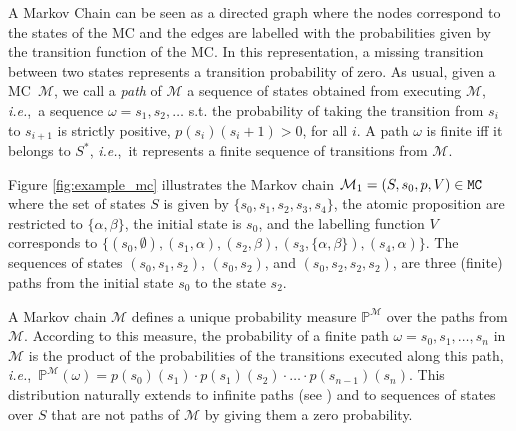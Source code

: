 \documentclass{llncs}
\newcommand{\mc}{\textnormal{MC}}
\newcommand{\mcSet} {\ensuremath{\tt{MC}}}
\newcommand{\ie} {{\em i.e.},\ }
\newcommand{\custompar}[1]{\smallskip \noindent {\bf #1}}
\begin{document}
A Markov Chain can be seen as a directed graph
where the nodes correspond to the states of the {\mc} and
the edges are labelled with the probabilities given by the transition function of the {\mc}.
In this representation, a missing transition between two states 
represents a transition probability of zero.
As usual, given a {\mc}~$\mathcal{M}$, we call a {\em path} of
$\mathcal{M}$ a sequence
of states obtained from executing $\mathcal{M}$, \ie a sequence
$\omega = s_1, s_2,\ldots $ s.t. the probability of taking the transition from $s_i$ to $s_{i+1}$ is strictly positive,   $p(s_i)(s_i+1) >0$, for all $i$.
A path $\omega$ is finite iff it belongs to $S^*$, \ie it
represents a finite sequence of transitions from $\mathcal{M}$.


\begin{example}\label{ex:mc}
Figure \ref{fig:example_mc} illustrates the Markov chain 
$\mathcal{M}_1 = (S, s_0, p, V) \in \mcSet$ where
the set of states $S$ is given by $\{s_0,s_1,s_2,s_3,s_4\}$, 
the atomic proposition are restricted to $\{\alpha, \beta\}$, 
the initial state is $s_0$, and the labelling 
function $V$ corresponds to $\{(s_0,\emptyset), (s_1,\alpha), (s_2,\beta), (s_3,\{\alpha, \beta\}), (s_4,\alpha)\}$.
The sequences of states $(s_0,s_1,s_2)$, $(s_0,s_2)$, and $(s_0,s_2,s_2,s_2)$, 
are three (finite) paths from the initial state $s_0$ to the state $s_2$.
\end{example}


\custompar{Reachability.}
A Markov chain $\mathcal{M}$ defines a unique probability measure
$\mathbb{P}^{\mathcal{M}}$ over the paths from
$\mathcal{M}$. According to this measure, the
probability of a finite path $\omega = s_0, s_1, \ldots, s_n$ in
$\mathcal{M}$ is the product of the probabilities of the transitions
executed along this path, \ie $\mathbb{P}^{\mathcal{M}}(\omega) =
p(s_0)(s_1) \cdot p(s_1)(s_2)\cdot \ldots \cdot p(s_{n-1})(s_n)$. This
distribution naturally extends to infinite paths (see
\cite{Baier2008PMC}) and to sequences of states over $S$
that are not paths of $\mathcal{M}$ by giving them a zero probability.
\end{document}
